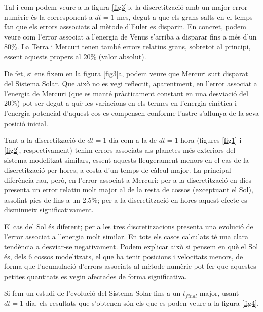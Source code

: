 \documentclass[10pt, twoside, a4paper]{article}
\begin{document}
Tal i com podem veure a la figura \ref{fig3}b, la discretització amb un major error numèric és la corresponent a $dt = 1$ mes, degut a que els grans salts en el temps fan que els errors asssociats al mètode d'Euler es disparin. En concret, podem veure com l'error associat a l'energia de Venus s'arriba a disparar fins a més d'un 80\%. La Terra i Mercuri tenen també errors relatius grans, sobretot al principi, essent aquests propers al 20\% (valor absolut). 

De fet, si ens fixem en la figura \ref{fig3}a, podem veure que Mercuri surt disparat del Sistema Solar. Que això no es vegi reflectit, aparentment, en l'error associat a l'energia de Mercuri (que es manté pràcticament constant en una desviació del 20\%) pot ser degut a què les variacions en els termes en l'energia cinètica i l'energia potencial d'aquest cos es compensen conforme l'astre s'allunya de la seva posició inicial.

Tant a la discretització de $dt = 1$ dia com a la de $dt = 1$ hora (figures \ref{fig1} i \ref{fig2}, respectivament) tenim errors associats als planetes més exteriors del sistema modelitzat similars, essent aquests lleugerament menors en el cas de la discretització per hores, a costa d'un temps de càlcul major. La principal diferència rau, però, en l'error associat a Mercuri: per a la discretització en dies presenta un error relatiu molt major al de la resta de cossos (exceptuant el Sol), assolint pics de fins a un 2.5\%; per a la discretització en hores aquest efecte es disminueix significativament.

El cas del Sol és diferent; per a les tres discretitzacions presenta una evolució de l'error associat a l'energia molt similar. En tots els casos calculats té una clara tendència a desviar-se negativament. Podem explicar això si pensem en què el Sol és, dels 6 cossos modelitzats, el que ha tenir posicions i velocitats menors, de forma que l'acumulació d'errors associats al mètode numèric pot fer que aquestes petites quantitats es vegin afectades de forma significativa.

Si fem un estudi de l'evolució del Sistema Solar fins a un $t_{final}$ major, usant $dt=1$ dia, els resultats que s'obtenen són els que es poden veure a la figura \ref{fig4}.
\end{document}
